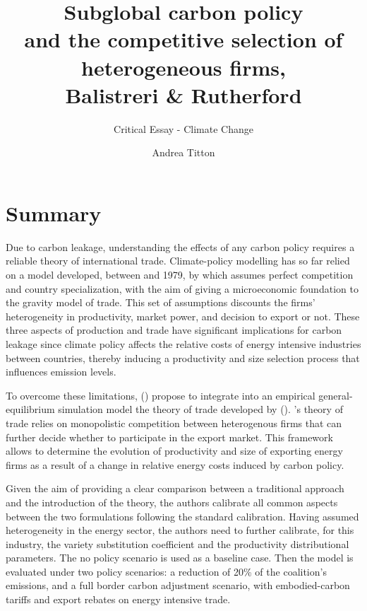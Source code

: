 \documentclass[american]{scrartcl}
\title{Subglobal carbon policy \\ and the competitive selection of heterogeneous firms, \\ Balistreri \& Rutherford}
\subtitle{Critical Essay - Climate Change}
\author{Andrea Titton}
\newcommand{\citein}[1]{\citeauthor{#1} (\citeyear{#1})}
\begin{document}
\maketitle


\section{Summary}

Due to carbon leakage, understanding the effects of any carbon policy requires a reliable theory of international trade. Climate-policy modelling has so far relied on a model developed, between \citeyear{Armington1969} and 1979, by \citeauthor{Armington1969} which assumes perfect competition and country specialization, with the aim of giving a microeconomic foundation to the gravity model of trade. This set of assumptions discounts the firms' heterogeneity in productivity, market power, and decision to export or not. These three aspects of production and trade have significant implications for carbon leakage since climate policy affects the relative costs of energy intensive industries between countries, thereby inducing a productivity and size selection process that influences emission levels.

To overcome these limitations, \citein{Balistreri2012} propose to integrate into an empirical general-equilibrium simulation model the theory of trade developed by \citein{Melitz2003}. \citeauthor{Melitz2003}'s theory of trade relies on monopolistic competition between heterogenous firms that can further decide whether to participate in the export market. This framework allows to determine the evolution of productivity and size of exporting energy firms as a result of a change in relative energy costs induced by carbon policy.

Given the aim of providing a clear comparison between a traditional \citeauthor{Armington1969} approach and the introduction of the \citeauthor{Melitz2003} theory, the authors calibrate all common aspects between the two formulations following the standard \citeauthor{Armington1969} calibration. Having assumed heterogeneity in the energy sector, the authors need to further calibrate, for this industry, the variety substitution coefficient and the productivity distributional parameters. The no policy scenario is used as a baseline case. Then the model is evaluated under two policy scenarios: a reduction of 20\% of the coalition's emissions, and a full border carbon adjustment scenario,  with embodied-carbon tariffs and export rebates on energy intensive trade.
\end{document}
